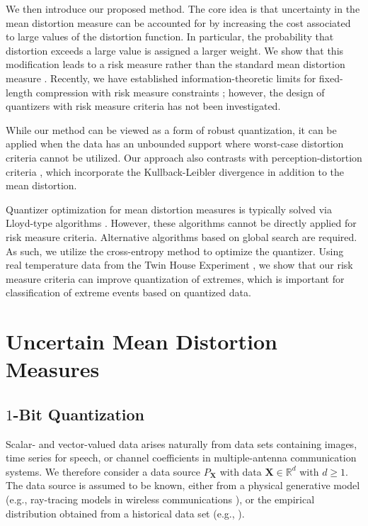 \documentclass[journal]{IEEEtran}
\begin{document}
We then introduce our proposed method. The core idea is that uncertainty in the mean distortion measure can be accounted for by increasing the cost associated to large values of the distortion function. In particular, the probability that distortion exceeds a large value is assigned a larger weight. We show that this modification leads to a risk measure rather than the standard mean distortion measure \cite{Yaari1987dual,Serada2010distortion}. Recently, we have established information-theoretic limits for fixed-length compression with risk measure constraints \cite{Egan2025risk}; however, the design of quantizers with risk measure criteria has not been investigated. 

While our method can be viewed as a form of robust quantization, it can be applied when the data has an unbounded support where worst-case distortion criteria \cite{Gersho2012vector} cannot be utilized. Our approach also contrasts with perception-distortion criteria \cite{Blau2019rethinking}, which incorporate the Kullback-Leibler divergence in addition to the mean distortion. %

Quantizer optimization for mean distortion measures is typically solved via Lloyd-type algorithms \cite{Gersho2012vector}. However, these algorithms cannot be directly applied for risk measure criteria. Alternative algorithms based on global search are required. As such, we utilize the cross-entropy method \cite{Botev2013cross} to optimize the quantizer. Using real temperature data from the Twin House Experiment \cite{Kersken2020}, we show that our risk measure criteria can improve quantization of extremes, which is important for classification of extreme events based on quantized data.  

\section{Uncertain Mean Distortion Measures}

\subsection{$1$-Bit Quantization}

Scalar- and vector-valued data arises naturally from data sets containing images, time series for speech, or channel coefficients in multiple-antenna communication systems. We therefore consider a data source $P_{\mathbf{X}}$ with data $\mathbf{X} \in \mathbb{R}^d$ with $d \geq 1$. The data source is assumed to be known, either from a physical generative model (e.g., ray-tracing models in wireless communications \cite{Hoydis2023sionna}), or the empirical distribution obtained from a historical data set (e.g., \cite{Kersken2020}). 
\end{document}
